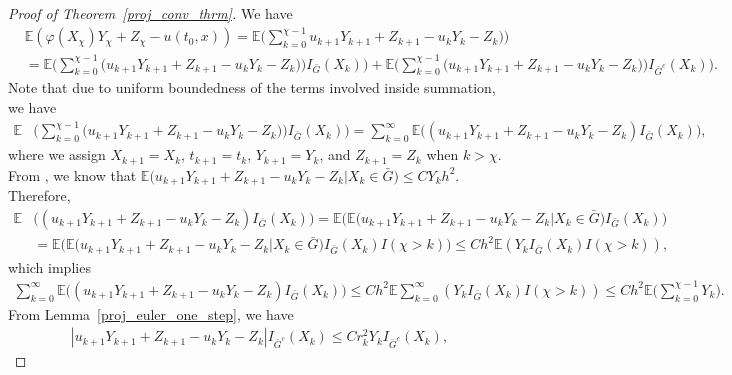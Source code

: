 \documentclass{article}
\theoremstyle{definition}
\numberwithin{equation}{section}
\begin{document}
\begin{proof}[Proof of Theorem~\ref{proj_conv_thrm}]
We have
\begin{align*}
&\mathbb{E}(\varphi(X_{\chi})Y_{\chi}  + Z_{\chi} - u(t_{0}, x)) = \mathbb{E}\Big(\sum\limits_{k=0}^{\chi -1 }u_{k+1}Y_{k+1} + Z_{k+1} - u_{k}Y_{k} - Z_{k})\Big) \\ & = \mathbb{E}\Big(\sum\limits_{k=0}^{\chi -1 }\big(u_{k+1}Y_{k+1} + Z_{k+1} - u_{k}Y_{k} - Z_{k})\big)I_{\bar{G}}(X_{k})\Big)  
+ \mathbb{E}\Big(\sum\limits_{k=0}^{\chi -1 }\big(u_{k+1}Y_{k+1} + Z_{k+1} - u_{k}Y_{k} - Z_{k})\big)I_{\bar{G}^{c}}(X_{k})\Big).
\end{align*}
 Note that due to uniform boundedness of the terms involved inside summation, we have
\begin{align*}
\mathbb{E}&\Big(\sum\limits_{k=0}^{\chi -1 }\big(u_{k+1}Y_{k+1} + Z_{k+1} - u_{k}Y_{k} - Z_{k})\big)I_{\bar{G}}(X_{k})\Big)  = \sum\limits_{k=0}^{\infty }\mathbb{E}\big((u_{k+1}Y_{k+1} + Z_{k+1} - u_{k}Y_{k} - Z_{k})I_{\bar{G}}(X_{k})\big),
\end{align*}
where we assign $X_{k+1} = X_{k}$, $t_{k+1} = t_{k}$, $Y_{k+1} = Y_{k}$, and $Z_{k+1} = Z_{k}$ when $k > \chi$.
From \cite{leimkuhler2023simplerandom}, we know that $
 \mathbb{E}\big(u_{k+1}Y_{k+1} + Z_{k+1} - u_{k}Y_{k} - Z_{k} | X_{k} \in \bar{G}\big) \leq CY_{k}h^{2}
$. Therefore,
\begin{align*}
\mathbb{E}&\big((u_{k+1}Y_{k+1} + Z_{k+1} - u_{k}Y_{k}  - Z_{k})I_{\bar{G}}(X_{k})\big) = \mathbb{E}\Big( \mathbb{E}\big(u_{k+1}Y_{k+1} + Z_{k+1} - u_{k}Y_{k} - Z_{k} | X_{k} \in \bar{G}\big)I_{\bar{G}}(X_{k})\Big) \\ & = \mathbb{E}\Big( \mathbb{E}\big(u_{k+1}Y_{k+1} + Z_{k+1} - u_{k}Y_{k} - Z_{k} | X_{k} \in \bar{G}\big)I_{\bar{G}}(X_{k})I(\chi > k)\Big) \leq Ch^{2} \mathbb{E}(Y_{k}I_{\bar{G}}(X_{k})I(\chi > k) ),
\end{align*}
which implies 
\begin{align*}
 \sum\limits_{k=0}^{\infty }\mathbb{E}\big((u_{k+1}Y_{k+1} + Z_{k+1} - u_{k}Y_{k} - Z_{k})I_{\bar{G}}(X_{k})\big) \leq Ch^{2} \mathbb{E}\sum\limits_{k=0}^{\infty}(Y_{k}I_{\bar{G}}(X_{k})I(\chi > k) ) \leq  Ch^{2} \mathbb{E}\Big(\sum\limits_{k=0}^{\chi-1}Y_{k}\Big).
\end{align*}
From Lemma~\ref{proj_euler_one_step}, we have
\begin{align}
|u_{k+1}Y_{k+1} + Z_{k+1} - u_{k}Y_{k} - Z_{k}|I_{\bar{G}^{c}}(X_{k}) \leq Cr_{k}^{2}Y_{k} I_{\bar{G}^{c}}(X_{k}),
\end{align}

\end{proof}
\end{document}
